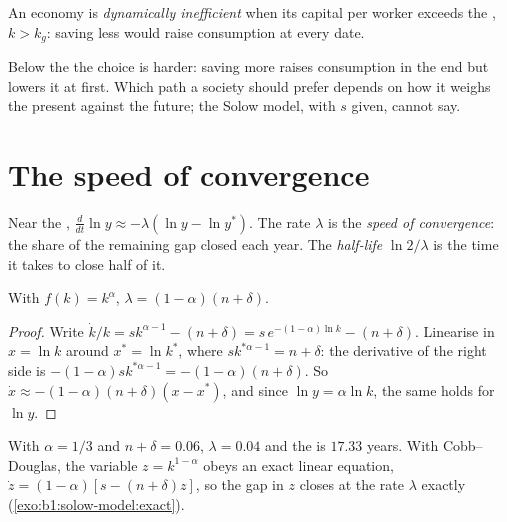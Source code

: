 \begin{definition}\label{def:b1:solow-model:dynamic-inefficiency}
An economy is \emph{dynamically inefficient} when its capital per worker
exceeds the , $k > k_g$: saving less would raise consumption at
every date.
\end{definition}

Below the  the choice is harder: saving more raises
consumption in the end but lowers it at first. Which path a society
should prefer depends on how it weighs the present against the future;
the Solow model, with $s$ given, cannot say.

\section{The speed of convergence}\label{sec:b1:solow-model:speed}

\begin{definition}\label{def:b1:solow-model:speed}
Near the , $\frac{d}{dt}\ln y \approx -\lambda(\ln y - \ln y^*)$. The rate $\lambda$ is the
\emph{speed of convergence}: the share of the remaining gap closed each
year. The \emph{half-life} $\ln 2/\lambda$ is the time it takes to close half of it.
\end{definition}

\begin{proposition}\label{prop:b1:solow-model:lambda}
With $f(k) = k^{\alpha}$, $\lambda = (1 - \alpha)(n + \delta)$.
\end{proposition}

\begin{proof}
Write $\dot k/k = sk^{\alpha - 1} - (n + \delta) = s\,e^{-(1 - \alpha)\ln k} - (n + \delta)$. Linearise in $x = \ln k$ around
$x^* = \ln k^*$, where $sk^{*\alpha - 1} = n + \delta$: the derivative of the right side is
$-(1 - \alpha)sk^{*\alpha - 1} = -(1 - \alpha)(n + \delta)$. So $\dot x \approx -(1 - \alpha)(n + \delta)(x - x^*)$, and since
$\ln y = \alpha \ln k$, the same holds for $\ln y$.
\end{proof}

With $\alpha = 1/3$ and $n + \delta = 0.06$, $\lambda = 0.04$ and the  is $17.33$ years.
With Cobb--Douglas, the variable $z = k^{1 - \alpha}$ obeys an exact linear equation,
$\dot z = (1 - \alpha)[s - (n + \delta)z]$, so the gap in $z$ closes at the rate $\lambda$ exactly
(\cref{exo:b1:solow-model:exact}).


